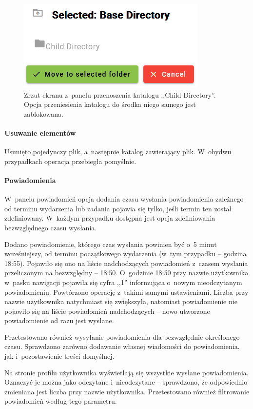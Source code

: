 \documentclass[a4paper,twoside,12pt]{book}
\begin{document}
\begin{figure}
\centering
\includegraphics{./MoveDirInactive.png}
\caption{Zrzut ekranu z~panelu przenoszenia katalogu ,,Child Directory''. Opcja przeniesienia katalogu do środka niego samego jest zablokowana.}
\label{fig:move-dir-inactive}
\end{figure}

\paragraph{Usuwanie elementów}
Usunięto pojedynczy plik, a~następnie katalog zawierający plik. W~obydwu przypadkach operacja przebiegła pomyślnie.

\paragraph{Powiadomienia}
W~panelu powiadomień opcja dodania czasu wysłania powiadomienia zależnego od terminu wydarzenia lub zadania pojawia się tylko, jeśli termin ten został zdefiniowany. W~każdym przypadku dostępna jest opcja zdefiniowania bezwzględnego czasu wysłania. 

Dodano powiadomienie, którego czas wysłania powinien być o~5 minut wcześniejszy, od terminu początkowego wydarzenia (w~tym przypadku -- godzina 18:55). Pojawiło się ono na liście nadchodzących powiadomień z~czasem wysłania przeliczonym na bezwzględny -- 18:50. O~godzinie 18:50 przy nazwie użytkownika w~pasku nawigacji pojawiła się cyfra ,,1'' informująca o~nowym nieodczytanym powiadomieniu. Powtórzono operację z~takimi samymi ustawieniami. Liczba przy nazwie użytkownika natychmiast się zwiększyła, natomiast powiadomienie nie pojawiło się na liście powiadomień nadchodzących -- nowo utworzone powiadomienie od razu jest wysłane. 

Przetestowano również wysyłanie powiadomienia dla bezwzględnie określonego czasu. Sprawdzono zarówno dodawanie własnej wiadomości do powiadomienia, jak i~pozostawienie treści domyślnej.

Na stronie profilu użytkownika wyświetlają się wszystkie wysłane powiadomienia. Oznaczyć je można jako odczytane i~nieodczytane -- sprawdzono, że odpowiednio zmieniana jest liczba przy nazwie użytkownika. Przetestowano również filtrowanie powiadomień według tego parametru.
\end{document}
